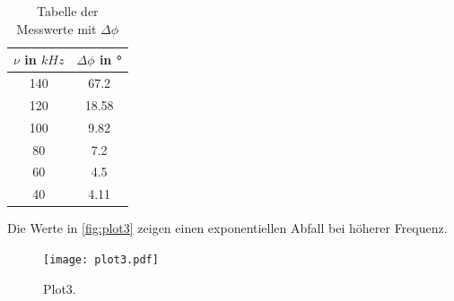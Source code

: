 \begin{table}[htb]
  \centering
  \caption{Tabelle der Messwerte mit \(\Delta\phi\)}
  \label{tab:tab4}
  \begin{tabular}{c c}
    \toprule
    $\nu$ in $kHz$ & $\Delta\phi$ in °\\
    \midrule
    140 & 67.2\\
    120 & 18.58\\
    100 & 9.82\\
    80 & 7.2\\
    60 & 4.5\\
    40 & 4.11\\
    \bottomrule
  \end{tabular}
\end{table}

Die Werte in \autoref{fig:plot3} zeigen einen exponentiellen Abfall bei höherer Frequenz.\\

\begin{figure}[htb]
  \centering
  \texttt{[image: plot3.pdf]}
  \caption{Plot3.}
  \label{fig:plot3}
\end{figure}

